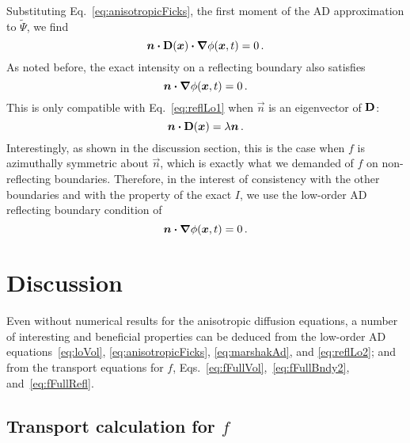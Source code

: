 Substituting Eq.~\eqref{eq:anisotropicFicks}, the first moment of the AD
approximation to $\tilde\Psi$, we find
\begin{equation}\label{eq:reflLo1}
  \bm{n} \bm{\cdot} \mathbf{D}(\bm{x}) \bm{\cdot} \bm{\nabla} \phi(\bm{x}, t) = 0\,.
\end{equation}
As noted before, the exact intensity on a reflecting boundary also satisfies
\begin{equation}\label{eq:reflZeroth}
  \bm{n}\bm{\cdot}\bm{\nabla} \phi(\bm{x}, t) = 0 \,.
\end{equation}
This is only compatible with Eq.~\eqref{eq:reflLo1} when $\vec{n}$ is an
eigenvector of $\mathbf{D}$:
\begin{equation*}
  \bm{n} \bm{\cdot} \mathbf{D}(\bm{x}) = \lambda \bm{n}\,.
\end{equation*}
Interestingly, as shown in the discussion section, this is the case when $f$ is
azimuthally symmetric about
$\vec{n}$, which is exactly what we demanded of $f$ on non-reflecting boundaries.
Therefore, in the interest of consistency with the other boundaries and with the
property of the exact $I$, we use the low-order AD reflecting boundary condition
of
\begin{equation}\label{eq:reflLo2}
  \bm{n} \bm{\cdot} \bm{\nabla} \phi(\bm{x}, t) = 0\,.
\end{equation}



\section{Discussion}
Even without numerical results for the anisotropic diffusion equations, a
number of interesting and beneficial properties can be deduced from the
low-order AD equations~\eqref{eq:loVol}, \eqref{eq:anisotropicFicks}, 
\eqref{eq:marshakAd}, and \eqref{eq:reflLo2}; and from the transport equations
for $f$, Eqs.~\eqref{eq:fFullVol},~\eqref{eq:fFullBndy2},
and~\eqref{eq:fFullRefl}.

\subsection{Transport calculation for $f$}


